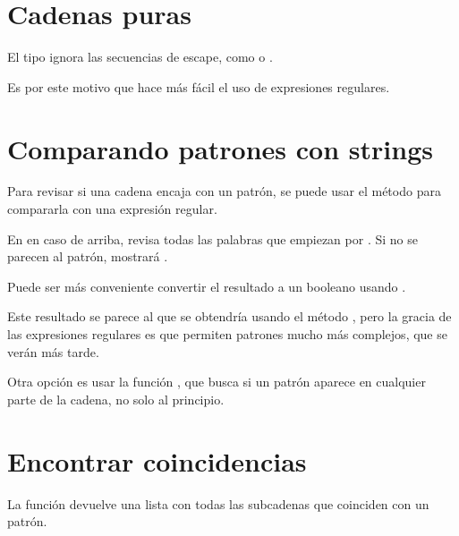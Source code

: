 
\section{Cadenas puras}

El tipo  ignora las secuencias de escape, como  o .


Es por este motivo que hace más fácil el uso de expresiones regulares.

\section{Comparando patrones con strings}

Para revisar si una cadena encaja con un patrón, se puede usar el método  para compararla con una expresión regular.


En en caso de arriba, revisa todas las palabras que empiezan por . Si no se parecen al patrón, mostrará .\smallskip

Puede ser más conveniente convertir el resultado  a un booleano usando .


Este resultado se parece al que se obtendría usando el método , pero la gracia de las expresiones regulares es que permiten patrones mucho más complejos, que se verán más tarde.\smallskip

Otra opción es usar la función , que busca si un patrón aparece en cualquier parte de la cadena, no solo al principio.


\section{Encontrar coincidencias}

La función  devuelve una lista con todas las subcadenas que coinciden con un patrón.

